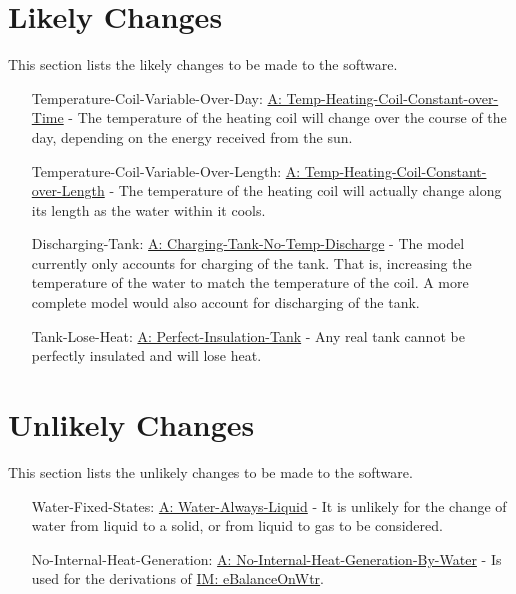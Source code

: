 \documentclass[12pt]{article}
\begin{document}
\section{Likely Changes}
\label{Sec:LCs}
This section lists the likely changes to be made to the software.
\begin{itemize}
\item[Temperature-Coil-Variable-Over-Day:\phantomsection\label{likeChgTCVOD}]\hyperref[assumpTHCCoT]{A: Temp-Heating-Coil-Constant-over-Time} - The temperature of the heating coil will change over the course of the day, depending on the energy received from the sun.
\item[Temperature-Coil-Variable-Over-Length:\phantomsection\label{likeChgTCVOL}]\hyperref[assumpTHCCoL]{A: Temp-Heating-Coil-Constant-over-Length} - The temperature of the heating coil will actually change along its length as the water within it cools.
\item[Discharging-Tank:\phantomsection\label{likeChgDT}]\hyperref[assumpCTNTD]{A: Charging-Tank-No-Temp-Discharge} - The model currently only accounts for charging of the tank. That is, increasing the temperature of the water to match the temperature of the coil. A more complete model would also account for discharging of the tank.
\item[Tank-Lose-Heat:\phantomsection\label{likeChgTLH}]\hyperref[assumpPIT]{A: Perfect-Insulation-Tank} - Any real tank cannot be perfectly insulated and will lose heat.
\end{itemize}
\section{Unlikely Changes}
\label{Sec:UCs}
This section lists the unlikely changes to be made to the software.
\begin{itemize}
\item[Water-Fixed-States:\phantomsection\label{unlikeChgWFS}]\hyperref[assumpWAL]{A: Water-Always-Liquid} - It is unlikely for the change of water from liquid to a solid, or from liquid to gas to be considered.
\item[No-Internal-Heat-Generation:\phantomsection\label{unlikeChgNIHG}]\hyperref[assumpNIHGBW]{A: No-Internal-Heat-Generation-By-Water} - Is used for the derivations of \hyperref[IM:eBalanceOnWtr]{IM: eBalanceOnWtr}.
\end{itemize}
\end{document}
